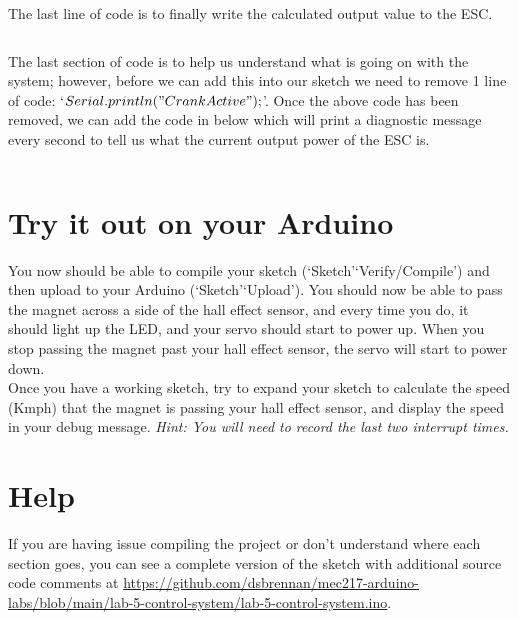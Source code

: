 \documentclass[11pt,a4paper]{article}
\begin{document}
\noindent
The last line of code is to finally write the calculated output value to the ESC.\\
\vspace{-1.75em}
\inputminted{arduino}{./src/5-esc-power.txt}
\vspace{.75em}

\noindent
The last section of code is to help us understand what is going on with the system; however, before we can add this into our sketch we need to remove 1 line of code: `$Serial.println("Crank Active");$'. Once the above code has been removed, we can add the code in below which will print a diagnostic message every second to tell us what the current output power of the ESC is.\\
\vspace{-1.75em}
\inputminted{arduino}{./src/6-message.txt}
\vspace{-1em}

\section*{Try it out on your Arduino}
You now should be able to compile your sketch (`Sketch'\textrightarrow `Verify/Compile') and then upload to your Arduino (`Sketch'\textrightarrow `Upload'). You should now be able to pass the magnet across a side of the hall effect sensor, and every time you do, it should light up the LED, and your servo should start to power up. When you stop passing the magnet past your hall effect sensor, the servo will start to power down.\\

\noindent
Once you have a working sketch, try to expand your sketch to calculate the speed (Kmph) that the magnet is passing your hall effect sensor, and display the speed in your debug message. \textit{Hint: You will need to record the last two interrupt times.}

\section*{Help}
If you are having issue compiling the project or don't understand where each section goes, you can see a complete version of the sketch with additional source code comments at \url{https://github.com/dsbrennan/mec217-arduino-labs/blob/main/lab-5-control-system/lab-5-control-system.ino}.

\begin{center}
\end{center}
\end{document}
